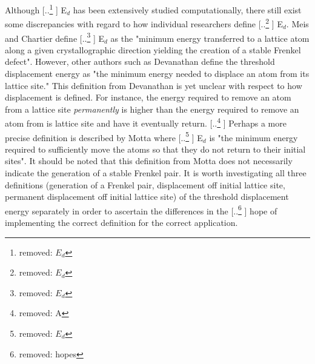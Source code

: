 \documentclass[review]{elsarticle} %
\providecommand{\DIFaddtex}[1]{{\protect\color{blue} \sf #1}} %
\providecommand{\DIFdeltex}[1]{{\protect\color{red} [..\footnote{removed: #1} ]}} %
\providecommand{\DIFaddbegin}{} %
\providecommand{\DIFaddend}{} %
\providecommand{\DIFdelbegin}{} %
\providecommand{\DIFdelend}{} %
\providecommand{\DIFadd}[1]{\texorpdfstring{\DIFaddtex{#1}}{#1}} %
\providecommand{\DIFdel}[1]{\texorpdfstring{\DIFdeltex{#1}}{}} %
\newcommand{\DIFscaledelfig}{0.5}
\newlength{\DIFdelgraphicswidth} %
\newlength{\DIFdelgraphicsheight} %
\newcommand{\DIFaddincludegraphics}[2][]{{\color{blue}\fbox{\DIFOincludegraphics[#1]{#2}}}} %
\newcommand{\DIFdelincludegraphics}[2][]{%
\sbox{\DIFdelgraphicsbox}{\DIFOincludegraphics[#1]{#2}}%
\settoboxwidth{\DIFdelgraphicswidth}{\DIFdelgraphicsbox} %
\settoboxtotalheight{\DIFdelgraphicsheight}{\DIFdelgraphicsbox} %
\scalebox{\DIFscaledelfig}{%
\parbox[b]{\DIFdelgraphicswidth}{\usebox{\DIFdelgraphicsbox}\\[-\baselineskip] \rule{\DIFdelgraphicswidth}{0em}}\llap{\resizebox{\DIFdelgraphicswidth}{\DIFdelgraphicsheight}{%
\setlength{\unitlength}{\DIFdelgraphicswidth}%
\begin{picture}(1,1)%
\thicklines\linethickness{2pt} %
{\color[rgb]{1,0,0}\put(0,0){\framebox(1,1){}}}%
{\color[rgb]{1,0,0}\put(0,0){\line( 1,1){1}}}%
{\color[rgb]{1,0,0}\put(0,1){\line(1,-1){1}}}%
\end{picture}%
}\hspace*{3pt}}} %
} %
\DeclareRobustCommand{\DIFaddbegin}{\DIFOaddbegin \let\includegraphics\DIFaddincludegraphics} %
\DeclareRobustCommand{\DIFaddend}{\DIFOaddend \let\includegraphics\DIFOincludegraphics} %
\DeclareRobustCommand{\DIFdelbegin}{\DIFOdelbegin \let\includegraphics\DIFdelincludegraphics} %
\DeclareRobustCommand{\DIFdelend}{\DIFOaddend \let\includegraphics\DIFOincludegraphics} %
\begin{document}
Although \DIFdelbegin \DIFdel{$E_d$ }\DIFdelend \DIFaddbegin \DIFadd{E$_d$ }\DIFaddend has been extensively studied computationally, there still exist some discrepancies with regard to how individual researchers define \DIFdelbegin \DIFdel{$E_d$}\DIFdelend \DIFaddbegin \DIFadd{E$_d$}\DIFaddend . Meis and Chartier \cite{meis2005} define \DIFdelbegin \DIFdel{$E_d$ }\DIFdelend \DIFaddbegin \DIFadd{E$_d$ }\DIFaddend as the "minimum energy transferred to a lattice atom along a given crystallographic direction yielding the creation of a stable Frenkel defect". However, other authors such as Devanathan \cite{devanathan1998} define the threshold displacement energy as "the minimum energy needed to displace an atom from its lattice site." This definition from Devanathan is yet unclear with respect to how displacement is defined. For instance, the energy required to remove an atom from a lattice site \textit{permanently} is higher than the energy required to remove an atom from is lattice site and have it eventually return. \DIFdelbegin \DIFdel{A }\DIFdelend \DIFaddbegin \DIFadd{Perhaps a }\DIFaddend more precise definition is described by Motta \cite{Motta} where \DIFdelbegin \DIFdel{$E_d$ }\DIFdelend \DIFaddbegin \DIFadd{E$_d$ }\DIFaddend is "the minimum energy required to sufficiently move the atoms so that they do not return to their initial sites". It should be noted that this definition from Motta does not necessarily indicate the generation of a stable Frenkel pair. It is worth investigating all three definitions (generation of a Frenkel pair, displacement off initial lattice site, permanent displacement off initial lattice site) of the threshold displacement energy separately in order to ascertain the differences in the \DIFdelbegin \DIFdel{hopes }\DIFdelend \DIFaddbegin \DIFadd{hope }\DIFaddend of implementing the correct definition for the correct application.
\end{document}
